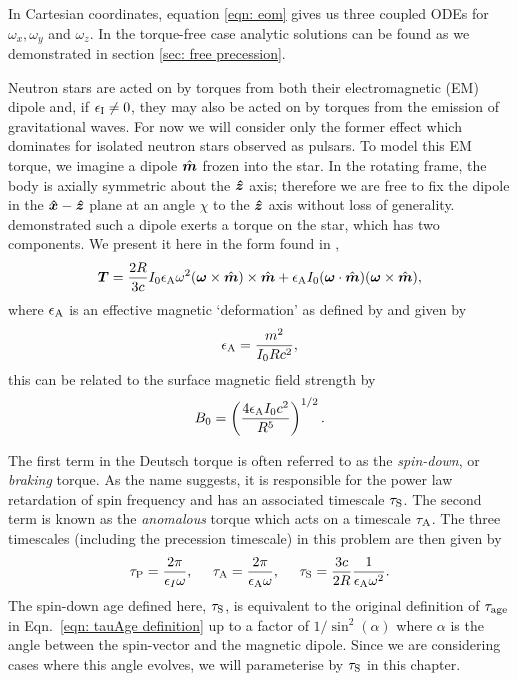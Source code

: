 \documentclass[../full_thesis/full_thesis.tex]{subfiles}
\begin{document}
In Cartesian coordinates, equation \ref{eqn: eom} gives us three coupled ODEs
for $\omega_{x}, \omega_{y}$ and $\omega_{z}$. In the torque-free case analytic
solutions can be found as we demonstrated in section \ref{sec: free precession}.

Neutron stars are acted on by torques from both their electromagnetic (EM)
dipole and, if $\epsilon_{\mathrm{I}} \ne 0$, they may also be acted on by torques from the
emission of gravitational waves. For now we will consider only the former
effect which dominates for isolated neutron stars observed as pulsars. To model
this EM torque, we imagine a dipole $\hat{\boldsymbol{m}}$ frozen into the star. In the rotating
frame, the body is axially symmetric about the $\boldsymbol{\hat{z}}$ axis; therefore we are free
to fix the dipole in the $\boldsymbol{\hat{x}}-\boldsymbol{\hat{z}}$ plane at an angle $\chi$ to the $\boldsymbol{\hat{z}}$ axis
without loss of generality. \citet{Deutsch1955} demonstrated such a dipole
exerts a torque on the star, which has two components. We present it here in the
form found in \citet{Goldreich1970},
\begin{equation}
\boldsymbol{T}=\frac{2R}{3c} I_{0}\epsilon_{\mathrm{A}}\omega^{2}
               (\boldsymbol{\omega} \times \hat{\boldsymbol{m}})\times \hat{\boldsymbol{m}}
               + \epsilon_{\mathrm{A}} I_{0}(\boldsymbol{\omega} \cdot \hat{\boldsymbol{m}})
               (\boldsymbol{\omega} \times \hat{\boldsymbol{m}}),
\label{eqn: torque}
\end{equation}
where $\epsilon_{\mathrm{A}}$ is an effective magnetic `deformation' as defined by \citet{Glampedakis2010}
and given by 
\begin{align}
\epsilon_{\mathrm{A}} = \frac{m^{2}}{I_{0}R c^{2}},
\end{align}
this can be related to the surface magnetic field strength by
\begin{equation}
    B_{0} = \left(\frac{4 \epsilon_{\mathrm{A}} I_{0} c^{2}}{R^{5}}\right)^{1/2}.
    \label{eqn: magnetic field epsA}
\end{equation}

The first term in the Deutsch torque is often referred to as the
\emph{spin-down}, or \emph{braking} torque. As the name suggests, it is
responsible for the power law retardation of spin frequency and has an
associated timescale $\tau_{\mathrm{S}}$. The second term is known as the
\emph{anomalous} torque which acts on a timescale $\tau_{\mathrm{A}}$. The three
timescales (including the precession timescale) in this problem are then given
by
\begin{equation}
\tau_{\mathrm{P}}=\frac{2\pi}{\epsilon_{I}\omega},  \;\;\;\;\;
\tau_{\mathrm{A}}=\frac{2\pi}{\epsilon_{\mathrm{A}}\omega},  \;\;\;\;\;
\tau_{\mathrm{S}}=\frac{3c}{2R}\frac{1}{\epsilon_{\mathrm{A}}\omega^{2}}.
\label{eqn: torque timescales}
\end{equation}
The spin-down age defined here, $\tau_{\mathrm{S}}$, is equivalent to the original
definition of $\tau_{\mathrm{age}}$ in Eqn.~\eqref{eqn: tauAge definition} up to a factor
of $1/\sin^{2}(\alpha)$ where $\alpha$ is the angle between the spin-vector and
the magnetic dipole. Since we are considering cases where this angle evolves, we
will parameterise by $\tau_{\mathrm{S}}$ in this chapter.
\end{document}
